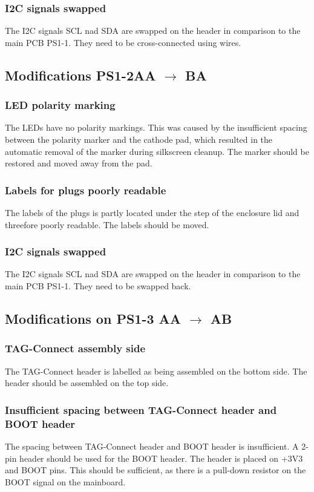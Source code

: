 \subsubsection{\acs{I2C} signals swapped}
The \ac{I2C} signals SCL nad SDA are swapped on the header in comparison to the main PCB PS1-1. They need to be cross-connected using wires. 

\subsection{Modifications PS1-2AA $\to$ BA}

\subsubsection{LED polarity marking}
The LEDs have no polarity markings. This was caused by the insufficient spacing between the polarity marker and the cathode pad, which resulted in the automatic removal of the marker during silkscreen cleanup. The marker should be restored and moved away from the pad. 

\subsubsection{Labels for plugs poorly readable}
The labels of the plugs is partly located under the step of the enclosure lid and threefore poorly readable. The labels should be moved. 

\subsubsection{\acs{I2C} signals swapped}
The \ac{I2C} signals SCL nad SDA are swapped on the header in comparison to the main PCB PS1-1. They need to be swapped back. 

\subsection{Modifications on PS1-3 AA $\to$ AB}

\subsubsection{TAG-Connect assembly side}
The TAG-Connect header is labelled as being assembled on the bottom side. The header should be assembled on the top side. 

\subsubsection{Insufficient spacing between TAG-Connect header and BOOT header}
The spacing between TAG-Connect header and BOOT header is insufficient. A 2-pin header should be used for the BOOT header. The header is placed on +3V3 and BOOT pins. This should be sufficient, as there is a pull-down resistor on the BOOT signal on the mainboard. 

